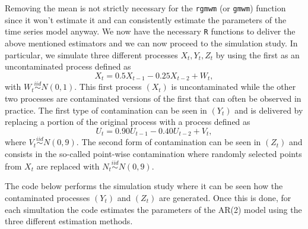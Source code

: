 \documentclass[]{book}
\theoremstyle{definition}
\theoremstyle{definition}
\theoremstyle{definition}
\theoremstyle{remark}
\begin{document}
Removing the mean is not strictly necessary for the \texttt{rgmwm} (or
\texttt{gmwm}) function since it won't estimate it and can consistently
estimate the parameters of the time series model anyway. We now have the
necessary \texttt{R} functions to deliver the above mentioned estimators
and we can now proceed to the simulation study. In particular, we
simulate three different processes \(X_t, Y_t, Z_t\) by using the first
as an uncontaminated process defined as
\[X_t = 0.5 X_{t-1} - 0.25 X_{t-2} + W_t,\] with
\(W_t \overset{iid}{\sim} N(0, 1)\). This first process \((X_t)\) is
uncontaminated while the other two processes are contaminated versions
of the first that can often be observed in practice. The first type of
contamination can be seen in \((Y_t)\) and is delivered by replacing a
portion of the original process with a process defined as
\[U_t = 0.90 U_{t-1} - 0.40 U_{t-2} + V_t,\] where
\(V_t \overset{iid}{\sim} N(0, 9)\). The second form of contamination
can be seen in \((Z_t)\) and consists in the so-called point-wise
contamination where randomly selected points from \(X_t\) are replaced
with \(N_t \overset{iid}{\sim} N(0, 9)\).

The code below performs the simulation study where it can be seen how
the contaminated processes \((Y_t)\) and \((Z_t)\) are generated. Once
this is done, for each simultation the code estimates the parameters of
the AR(2) model using the three different estimation methods.
\end{document}
